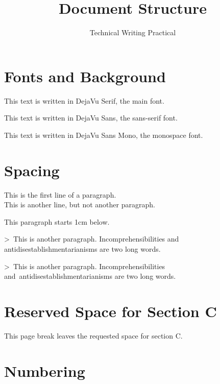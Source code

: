 \documentclass[12pt,a4paper]{article}
\title{Document Structure}
\author{Technical Writing Practical}
\date{}
\begin{document}
\maketitle

\section{Fonts and Background}

\begin{trivlist}

\item This text is written in DejaVu Serif, the main font.

\item {\sffamily This text is written in DejaVu Sans, the sans-serif font.}

\item {\ttfamily This text is written in DejaVu Sans Mono, the monospace font.}

\end{trivlist}

\section{Spacing}

This is the first line of a paragraph.\\
This is another line, but not another paragraph.

\vspace{1cm}

This paragraph starts 1cm below.

\medskip

\noindent\textgreater\ This is another paragraph. Incomprehensibilities and antidisestablishmentarianisms are two long words.

\medskip

\noindent\textgreater\ This is another paragraph. Incomprehensibilities \mbox{and antidisestablishmentarianisms} are two long words.

\newpage

\section{Reserved Space for Section C}

This page break leaves the requested space for section C.

\section{Numbering}
\end{document}
